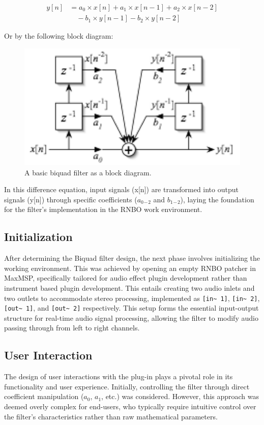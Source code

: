 \documentclass[10pt,twocolumn]{article}
\begin{document}
\begin{align}
    y[n] &= a_0 \times x[n] + a_1 \times x[n-1] + a_2 \times x[n-2] \nonumber \\
         &\quad - b_1 \times y[n-1] - b_2 \times y[n-2]
\end{align}

Or by the following block diagram:

\begin{figure}[htbp]
  \centering
  \includegraphics[width=0.8\linewidth]{biquad.png}
  \caption{A basic biquad filter as a block diagram. \cite{MaxMSPBiquad}}
  \label{fig:biquad}
\end{figure}

In this difference equation, input signals (x[n]) are transformed into output signals (y[n]) through specific coefficients ($a_0{_-}{_2}$ and $b_1{_-}{_2}$), laying the foundation for the filter's implementation in the RNBO work environment\cite{SmithDiff}.
\subsection{Initialization}
After determining the Biquad filter design, the next phase involves initializing the working environment. This was achieved by opening an empty RNBO patcher in MaxMSP, specifically tailored for audio effect plugin development rather than instrument based plugin development. This entails creating two audio inlets and two outlets to accommodate stereo processing, implemented as \verb|[in~ 1]|, \verb|[in~ 2]|, \verb|[out~ 1]|, and \verb|[out~ 2]| respectively. This setup forms the essential input-output structure for real-time audio signal processing, allowing the filter to modify audio passing through from left to right channels.
\subsection{User Interaction}
The design of user interactions with the plug-in plays a pivotal role in its functionality and user experience. Initially, controlling the filter through direct coefficient manipulation ($a_0$, $a_1$, etc.) was considered. However, this approach was deemed overly complex for end-users, who typically require intuitive control over the filter's characteristics rather than raw mathematical parameters.
\end{document}
